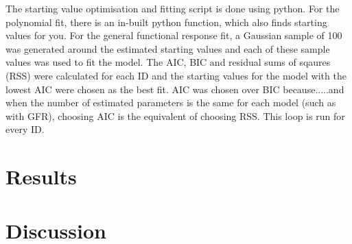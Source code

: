 \documentclass[11pt, a4paper, titlepage]{article}
\begin{document}
The starting value optimisation and fitting script is done using python. For the polynomial fit, there is an in-built python function, which also finds starting values for you. For the general functional response fit, a Gaussian sample of 100 was generated around the estimated starting values and each of these sample values was used to fit the model. The AIC, BIC and residual sums of sqaures (RSS) were calculated for each ID and the starting values for the model with the lowest AIC were chosen as the best fit. AIC was chosen over BIC because.....and when the number of estimated parameters is the same for each model (such as with GFR), choosing AIC is the equivalent of choosing RSS. This loop is run for every ID.

\section{Results}

\section{Discussion}
\end{document}
